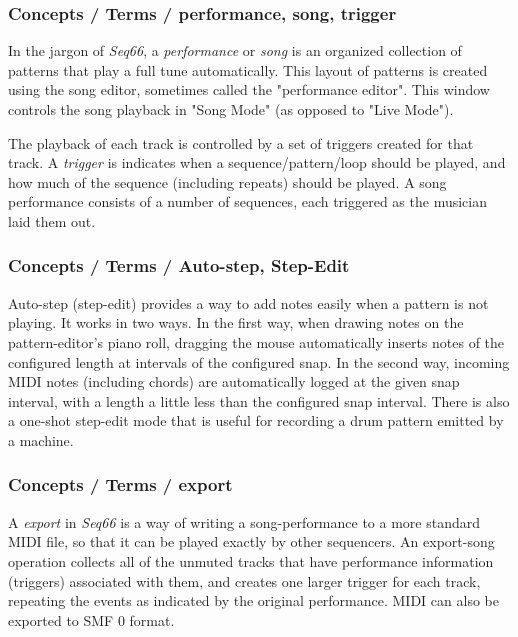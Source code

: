 \subsubsection{Concepts / Terms / performance, song, trigger}
\label{subsubsec:concepts_terms_performance}

   In the jargon of \textsl{Seq66}, a
   \textsl{performance} or
   \textsl{song} is an organized collection of patterns that play a full tune
   automatically.
   This layout of patterns is created using the song editor, sometimes
   called the "performance editor".
   This window controls the song playback in "Song Mode"
   (as opposed to "Live Mode").

   The playback of each track is controlled by a set of triggers created for
   that track.
   A \textsl{trigger} is indicates when a sequence/pattern/loop
   should be played, and how much of the sequence (including repeats) should be
   played.  A song performance consists of a number of sequences, each
   triggered as the musician laid them out.

\subsubsection{Concepts / Terms / Auto-step, Step-Edit}
\label{subsubsec:concepts_terms_auto_step}

   Auto-step (step-edit) provides a way to add notes easily when a pattern is
   not playing.  It works in two ways.  In the first way, when drawing notes on
   the pattern-editor's piano roll, dragging the mouse automatically inserts
   notes of the configured length at intervals of the configured snap.
   In the second way, incoming MIDI notes (including chords)
   are automatically logged at the given snap interval, with a length a little
   less than the configured snap interval.
   There is also a one-shot step-edit mode that is useful for recording a drum
   pattern emitted by a machine.

\subsubsection{Concepts / Terms / export}
\label{subsubsec:concepts_terms_export}

   A \textsl{export} in \textsl{Seq66} is a way of writing a
   song-performance to a more standard MIDI file, so that it can be played
   exactly by other sequencers.
   An export-song operation collects all of the unmuted tracks that have
   performance information (triggers) associated with them, and creates one
   larger trigger for each track, repeating the events as indicated by the
   original performance.
   MIDI can also be exported to SMF 0 format.

